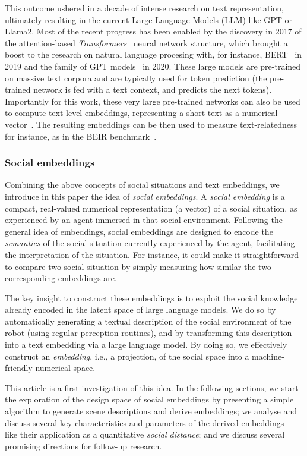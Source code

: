This outcome ushered in a decade of intense research on text representation,
ultimately resulting in the current Large Language Models (LLM) like GPT or
Llama2.  Most of the recent progress has been enabled by the discovery in 2017
of the attention-based \emph{Transformers}~\cite{vaswani2017attention} neural
network structure, which brought a boost to the research on natural language
procesing with, for instance, BERT~\cite{devlin2019bert} in 2019 and the family
of GPT models~\cite{wolf2020transformers} in 2020.  These large models
are pre-trained on massive text corpora and are typically used for token
prediction (the pre-trained network is fed with a text context, and predicts the
next tokens).  Importantly for this work, these very large pre-trained networks
can also be used to compute text-level embeddings, representing a short text as
a numerical vector~\cite{reimers2019sentencebert,muennighoff2022sgpt}. The
resulting embeddings can be then used to measure text-relatedness for instance,
as in the BEIR benchmark~\cite{thakur2021beir}.

\subsubsection{Social embeddings}

\begin{rewrite}
Combining the above concepts of social situations and text embeddings, we introduce in
this paper the idea of \emph{social embeddings}. A \emph{social embedding} is a
compact, real-valued numerical representation (a vector) of a social
situation, as experienced by an agent immersed in that social environment.
Following the general idea of embeddings, social embeddings are designed
to encode the \emph{semantics} of the social situation currently experienced by
the agent, facilitating the interpretation of the situation. For instance, it
could make it straightforward to compare two social situation by simply
measuring how similar the two corresponding embeddings are.

The key insight to construct these embeddings is to exploit the social knowledge
already encoded in the latent space of large language models. We do so by
automatically generating a textual description of the social environment of the
robot (using regular perception routines), and by transforming this
description into a text embedding via a large language model. By doing so, we
effectively construct an \emph{embedding}, i.e., a projection, of the social
space into a machine-friendly numerical space.

This article is a first investigation of this idea. In the following sections,
we start the exploration of the design space of social embeddings by presenting
a simple algorithm to generate scene descriptions and derive embeddings; we
analyse and discuss several key characteristics and parameters of the derived
embeddings -- like their application as a quantitative \emph{social distance};
and we discuss several promising directions for follow-up research.

\end{rewrite}

